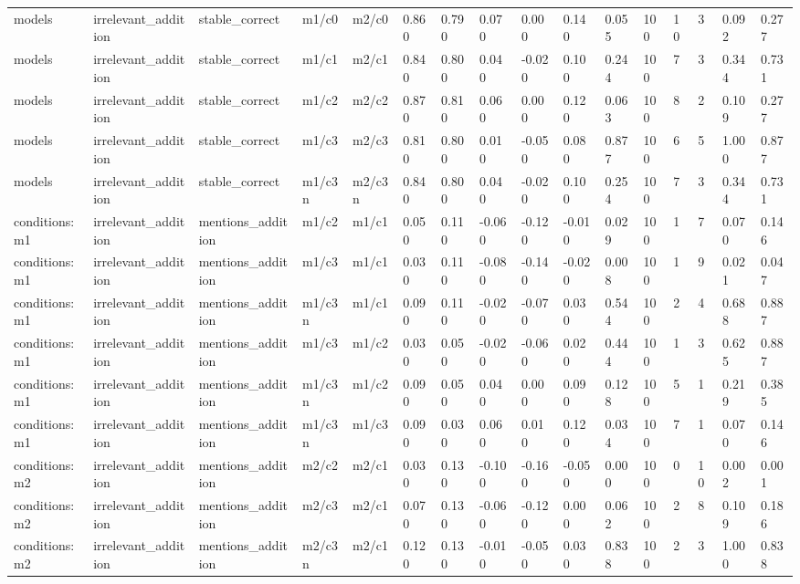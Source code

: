 \begin{tabular}{llllllllllllllll}
models & irrelevant\_addition & stable\_correct & m1/c0 & m2/c0 & 0.860 & 0.790 & 0.070 & 0.000 & 0.140 & 0.055 & 100 & 10 & 3 & 0.092 & 0.277 \\
models & irrelevant\_addition & stable\_correct & m1/c1 & m2/c1 & 0.840 & 0.800 & 0.040 & -0.020 & 0.100 & 0.244 & 100 & 7 & 3 & 0.344 & 0.731 \\
models & irrelevant\_addition & stable\_correct & m1/c2 & m2/c2 & 0.870 & 0.810 & 0.060 & 0.000 & 0.120 & 0.063 & 100 & 8 & 2 & 0.109 & 0.277 \\
models & irrelevant\_addition & stable\_correct & m1/c3 & m2/c3 & 0.810 & 0.800 & 0.010 & -0.050 & 0.080 & 0.877 & 100 & 6 & 5 & 1.000 & 0.877 \\
models & irrelevant\_addition & stable\_correct & m1/c3n & m2/c3n & 0.840 & 0.800 & 0.040 & -0.020 & 0.100 & 0.254 & 100 & 7 & 3 & 0.344 & 0.731 \\
conditions:m1 & irrelevant\_addition & mentions\_addition & m1/c2 & m1/c1 & 0.050 & 0.110 & -0.060 & -0.120 & -0.010 & 0.029 & 100 & 1 & 7 & 0.070 & 0.146 \\
conditions:m1 & irrelevant\_addition & mentions\_addition & m1/c3 & m1/c1 & 0.030 & 0.110 & -0.080 & -0.140 & -0.020 & 0.008 & 100 & 1 & 9 & 0.021 & 0.047 \\
conditions:m1 & irrelevant\_addition & mentions\_addition & m1/c3n & m1/c1 & 0.090 & 0.110 & -0.020 & -0.070 & 0.030 & 0.544 & 100 & 2 & 4 & 0.688 & 0.887 \\
conditions:m1 & irrelevant\_addition & mentions\_addition & m1/c3 & m1/c2 & 0.030 & 0.050 & -0.020 & -0.060 & 0.020 & 0.444 & 100 & 1 & 3 & 0.625 & 0.887 \\
conditions:m1 & irrelevant\_addition & mentions\_addition & m1/c3n & m1/c2 & 0.090 & 0.050 & 0.040 & 0.000 & 0.090 & 0.128 & 100 & 5 & 1 & 0.219 & 0.385 \\
conditions:m1 & irrelevant\_addition & mentions\_addition & m1/c3n & m1/c3 & 0.090 & 0.030 & 0.060 & 0.010 & 0.120 & 0.034 & 100 & 7 & 1 & 0.070 & 0.146 \\
conditions:m2 & irrelevant\_addition & mentions\_addition & m2/c2 & m2/c1 & 0.030 & 0.130 & -0.100 & -0.160 & -0.050 & 0.000 & 100 & 0 & 10 & 0.002 & 0.001 \\
conditions:m2 & irrelevant\_addition & mentions\_addition & m2/c3 & m2/c1 & 0.070 & 0.130 & -0.060 & -0.120 & 0.000 & 0.062 & 100 & 2 & 8 & 0.109 & 0.186 \\
conditions:m2 & irrelevant\_addition & mentions\_addition & m2/c3n & m2/c1 & 0.120 & 0.130 & -0.010 & -0.050 & 0.030 & 0.838 & 100 & 2 & 3 & 1.000 & 0.838 \\

\end{tabular}
